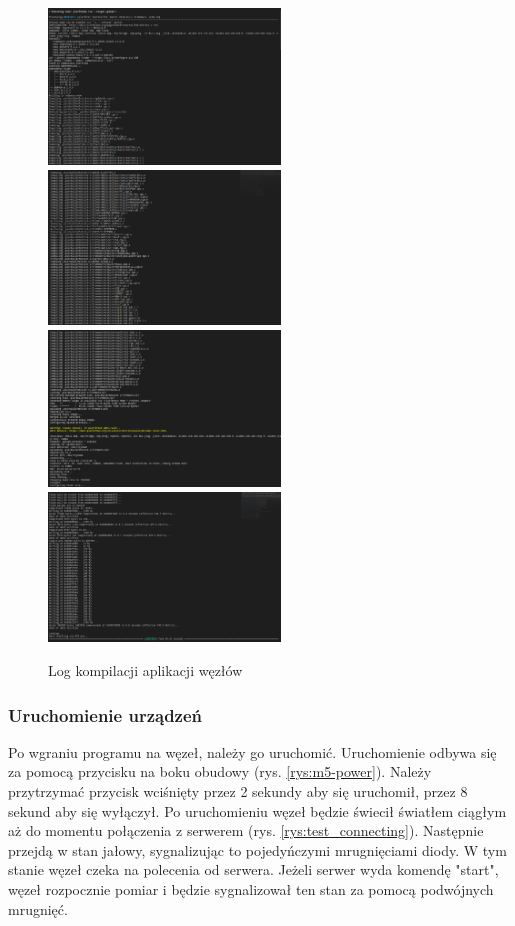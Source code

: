 \documentclass[12pt,oneside,a4paper]{book}
\theoremstyle{break}
\begin{document}
\begin{figure}[H]
    \begin{center}
        \includegraphics[width=0.55\textwidth]{uc-comp-1.png}
        \includegraphics[width=0.55\textwidth]{uc-comp-2.png}
        \includegraphics[width=0.55\textwidth]{uc-comp-3.png}
        \includegraphics[width=0.55\textwidth]{uc-comp-4.png}
        \caption{Log kompilacji aplikacji węzłów}
        \label{rys:compile-log}
    \end{center}
\end{figure}
\subsubsection{Uruchomienie urządzeń}
Po wgraniu programu na węzeł, należy go uruchomić. Uruchomienie odbywa się za pomocą
przycisku na boku obudowy (rys. \ref{rys:m5-power}). Należy przytrzymać przycisk wciśnięty przez
2 sekundy aby się uruchomił, przez 8 sekund aby się wyłączył. Po uruchomieniu węzeł
będzie świecił światłem ciągłym aż do momentu połączenia z serwerem (rys. \ref{rys:test_connecting}).
Następnie przejdą w stan jałowy, sygnalizując to pojedyńczymi mrugnięciami diody. W tym stanie
węzeł czeka na polecenia od serwera. Jeżeli serwer wyda komendę "start", węzeł rozpocznie
pomiar i będzie sygnalizował ten stan za pomocą podwójnych mrugnięć.
\end{document}
